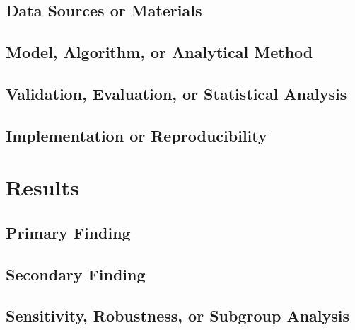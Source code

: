 \documentclass[Afour,sagev,times]{sagej}
\begin{document}
\subsection{Data Sources or Materials}


\subsection{Model, Algorithm, or Analytical Method}


\subsection{Validation, Evaluation, or Statistical Analysis}


\subsection{Implementation or Reproducibility}


\section{Results}


\subsection{Primary Finding}


\subsection{Secondary Finding}


\subsection{Sensitivity, Robustness, or Subgroup Analysis}
\end{document}
